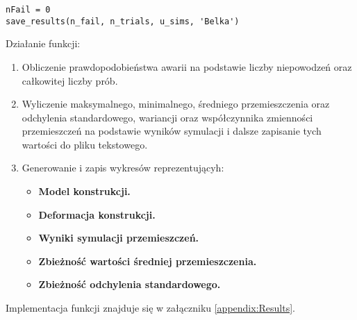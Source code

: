 \begin{lstlisting}
nFail = 0
save_results(n_fail, n_trials, u_sims, 'Belka')
\end{lstlisting}
Działanie funkcji:

\begin{enumerate}
    \item Obliczenie prawdopodobieństwa awarii na podstawie liczby niepowodzeń oraz całkowitej liczby prób.
    \item Wyliczenie maksymalnego, minimalnego, średniego przemieszczenia oraz odchylenia standardowego, wariancji oraz współczynnika zmienności przemieszczeń na podstawie wyników symulacji i dalsze zapisanie tych wartości do pliku tekstowego.
    \item Generowanie i zapis wykresów reprezentującyh:
    \begin{itemize}
        \item \textbf{Model konstrukcji.}
        \item \textbf{Deformacja konstrukcji.}
        \item \textbf{Wyniki symulacji przemieszczeń.}
        \item \textbf{Zbieżność wartości średniej przemieszczenia.}
        \item \textbf{Zbieżność odchylenia standardowego.}
    \end{itemize}
\end{enumerate}
Implementacja funkcji znajduje się w załączniku \ref{appendix:Results}.
